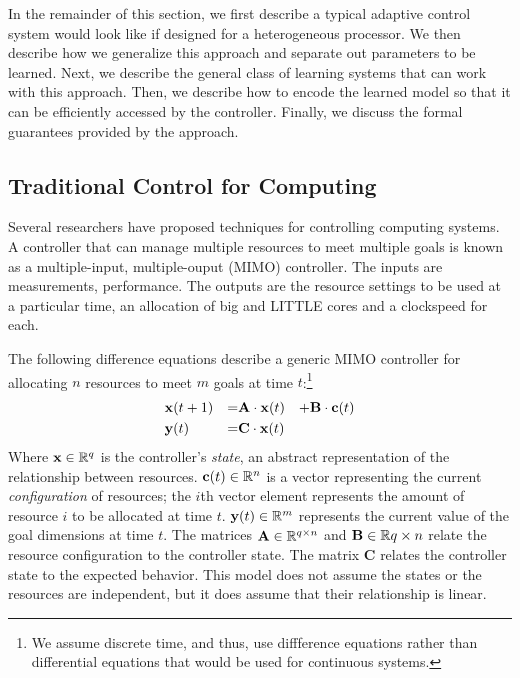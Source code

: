 In the remainder of this section, we first describe a typical adaptive
control system would look like if designed for a heterogeneous
processor.  We then describe how we generalize this approach and
separate out parameters to be learned.  Next, we describe the general
class of learning systems that can work with this approach.  Then, we
describe how to encode the learned model so that it can be efficiently
accessed by the controller.  Finally, we discuss the formal guarantees
provided by the \SYSTEM{} approach.


\subsection{Traditional Control for Computing}
Several researchers have proposed techniques for controlling computing
systems.  A controller that can manage multiple resources to meet
multiple goals is known as a multiple-input, multiple-ouput (MIMO)
controller.  The inputs are measurements, \eg{} performance.  The
outputs are the resource settings to be used at a particular time,
\eg{} an allocation of big and LITTLE cores and a clockspeed for each.

The following difference equations describe a generic MIMO controller
for allocating $n$ resources to meet $m$ goals at time
$t$:\footnote{We assume discrete time, and thus, use diffference
  equations rather than differential equations that would be used for
  continuous systems.}
\begin{equation}
\begin{aligned}
&\mathbf{x}(t+1) &=& \mathbf{A} \cdot \mathbf{x}(t)& + \mathbf{B} \cdot \mathbf{c}(t)\\
&\mathbf{y}(t)   &=& \mathbf{C} \cdot \mathbf{x}(t)&
\end{aligned}
\label{eqn:system:mimo}
\end{equation}
Where $\mathbf{x} \in \mathbb{R}^{q}$ is the controller's \emph{state}, an abstract
representation of the relationship between resources.  $\mathbf{c}(t)
\in \mathbb{R}^n$ is a vector representing the current \emph{configuration} of
resources; \ie{} the $i$th vector element represents the amount of
resource $i$ to be allocated at time $t$.  $\mathbf{y}(t) \in \mathbb{R}^{m}$
represents the current value of the goal dimensions at time $t$. The
matrices $\mathbf{A} \in \mathbb{R}^{q \times n}$ and $\mathbf{B} \in \mathbb{R}{q
\times n}$ relate the resource configuration to the controller state.
The matrix $\mathbf{C}$ relates the controller state to the expected
behavior.  This model does not assume the states or the resources are
independent, but it does assume that their relationship is linear.  

